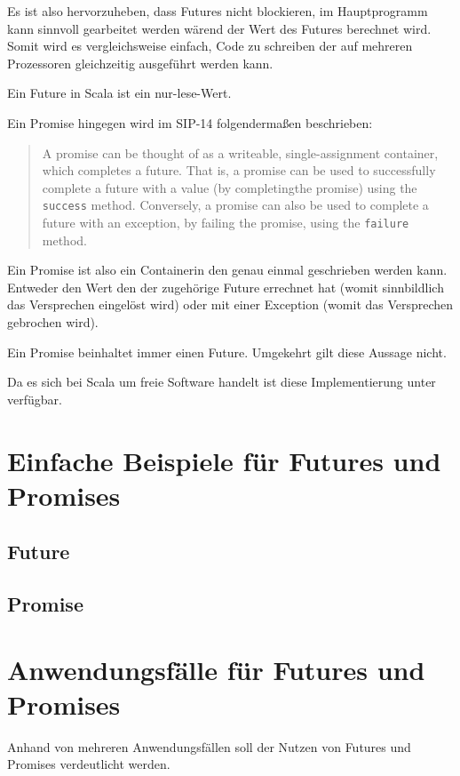 \documentclass[11pt,a4paper,titlepage,ngerman]{scrartcl}
\begin{document}
Es ist also hervorzuheben, dass Futures nicht blockieren, im Hauptprogramm
kann sinnvoll gearbeitet werden wärend der Wert des Futures berechnet wird.
Somit wird es vergleichsweise einfach, Code zu schreiben der auf mehreren
Prozessoren gleichzeitig ausgeführt werden kann.

Ein Future in Scala ist ein nur-lese-Wert.

Ein Promise hingegen wird im SIP-14 folgendermaßen beschrieben:
\begin{quote}
A promise can be thought of as a writeable, single-assignment container, which 
completes a future. That is, a promise can be used to successfully complete a 
future with a value (by \glqq completing\grqq the promise) using the \texttt{success} method. 
Conversely, a promise can also be used to complete a future with an exception, 
by failing the promise, using the \texttt{failure} method.
\end{quote}

Ein Promise ist also ein \glqq Container\grqq in den genau einmal geschrieben
werden kann. Entweder den Wert den der zugehörige Future errechnet hat
(womit sinnbildlich das Versprechen eingelöst wird) oder mit einer Exception
(womit das Versprechen gebrochen wird).

Ein Promise beinhaltet immer einen Future. Umgekehrt gilt diese Aussage nicht.

Da es sich bei Scala um freie Software handelt ist diese Implementierung
unter \cite{scalaConcurrentCode} verfügbar.

\section{Einfache Beispiele für Futures und Promises}

\subsection{Future}

\subsection{Promise}

\section{Anwendungsfälle für Futures und Promises}

Anhand von mehreren Anwendungsfällen soll der Nutzen von Futures und Promises
verdeutlicht werden. 
\end{document}
